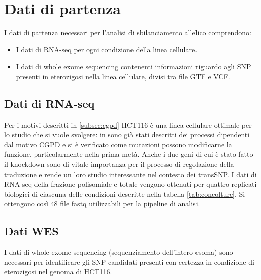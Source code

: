 \section{Dati di partenza}
\label{sec:datiinput}
I dati di partenza necessari per l'analisi di sbilanciamento allelico comprendono:
\begin{itemize}
  \item I dati di RNA-seq per ogni condizione della linea cellulare.
  \item I dati di whole exome sequencing contenenti informazioni riguardo agli SNP presenti in eterozigosi nella linea cellulare, divisi tra file GTF e VCF.
\end{itemize}

  \subsection{Dati di RNA-seq}
  Per i motivi descritti in \ref{subsec:cgpd} HCT116 \`e una linea cellulare ottimale per lo studio che si vuole svolgere: in \cite{nutlin} sono gi\`a stati descritti dei processi dipendenti dal motivo CGPD e si \`e verificato come mutazioni possono modificarne la funzione, particolarmente nella prima met\`a.
  Anche i due geni di cui \`e stato fatto il knockdown sono di vitale importanza per il processo di regolazione della traduzione e rende un loro studio interessante nel contesto dei transSNP.
  I dati di RNA-seq della frazione polisomiale e totale vengono ottenuti per quattro replicati biologici di ciascuna delle condizioni descritte nella tabella \ref{tab:concolture}.
  Si ottengono cos\`i $48$ file fastq utilizzabili per la pipeline di analisi.

  \subsection{Dati WES}
  I dati di whole exome sequencing (sequenziamento dell'intero esoma) sono necessari per identificare gli SNP candidati presenti con certezza in condizione di eterozigosi nel genoma di HCT116.
